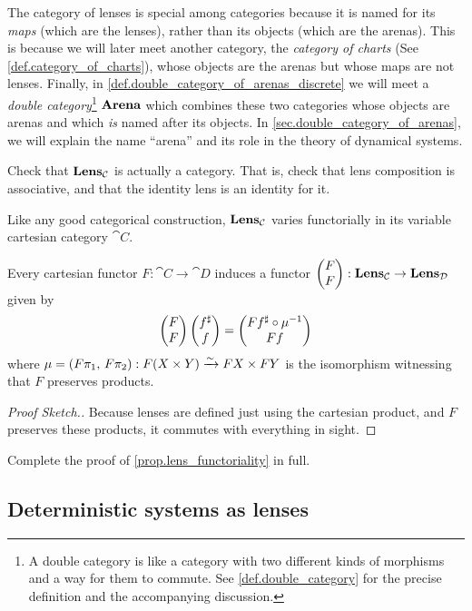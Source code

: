 \documentclass[DynamicalBook]{subfiles}
\begin{document}
\begin{remark}
  The category of lenses is special among categories because it is named for its
  \emph{maps} (which are the lenses), rather than its objects (which are the
  arenas). This is because we will later meet another category, the
  \emph{category of charts} (See \cref{def.category_of_charts}), whose objects are
  the arenas but whose maps are not lenses. Finally, in
  \cref{def.double_category_of_arenas_discrete} we will meet a \emph{double
    category}\footnote{A double category is like a category with two different
    kinds of morphisms and a way for them to commute. See
    \cref{def.double_category} for the precise definition and the accompanying
    discussion.} $\textbf{Arena}$ which combines these two categories whose objects
  are arenas and which \emph{is} named after its objects. In
  \cref{sec.double_category_of_arenas}, we will explain the name ``arena'' and
  its role in the theory of dynamical systems.
\end{remark}

\begin{exercise}
  Check that $\textbf{Lens}_{\mathcal{C}}$ is actually a category. That is, check that
  lens composition is associative, and that the identity lens is an identity for it.
\end{exercise}

Like any good categorical construction, $\textbf{Lens}_{\mathcal{C}}$ varies
functorially in its variable cartesian category $\cat{C}$.
\begin{proposition}\label{prop.lens_functoriality}
  Every cartesian functor $F : \cat{C} \to \cat{D}$ induces a functor
  $\begin{pmatrix}{F} \\ {F} \end{pmatrix} : \textbf{Lens}_{\mathcal{C}} \to \textbf{Lens}_{\mathcal{D}}$ given by
  $$\begin{pmatrix}{F} \\ {F} \end{pmatrix}\begin{pmatrix}{f^{\sharp}} \\ {f} \end{pmatrix} = \begin{pmatrix}{Ff^{\sharp} \circ \mu^{-1}} \\ {Ff} \end{pmatrix}$$
  where $\mu = (F\pi_1,\, F\pi_2) : F(X \times Y) \xrightarrow{\sim} FX \times FY$ is
  the isomorphism witnessing that $F$ preserves products.
\end{proposition}
\begin{proof}[Proof Sketch.]
  Because lenses are defined just using the cartesian product, and $F$ preserves
  these products, it commutes with everything in sight.
\end{proof}

\begin{exercise}
  Complete the proof of \cref{prop.lens_functoriality} in full. 
\end{exercise}

\subsection{Deterministic systems as lenses}
\end{document}

